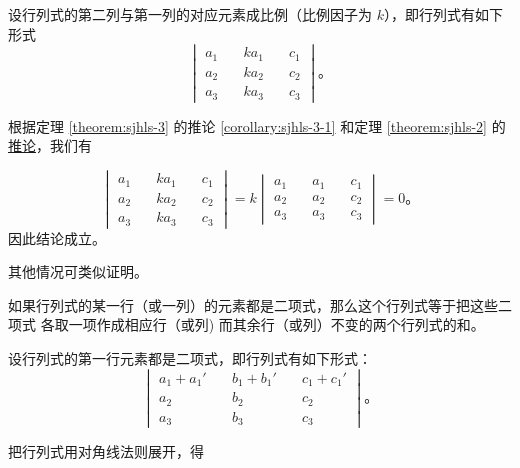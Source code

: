 \zhengming 设行列式的第二列与第一列的对应元素成比例（比例因子为 $k$），即行列式有如下形式
$$
\begin{vmatrix*}
    a_1 \quad & ka_1 \quad & c_1 \\
    a_2 \quad & ka_2 \quad & c_2 \\
    a_3 \quad & ka_3 \quad & c_3
\end{vmatrix*} \text{。}
$$

根据定理 \ref{theorem:sjhls-3} 的推论 \ref{corollary:sjhls-3-1}
和定理 \ref{theorem:sjhls-2} 的 \hyperref[corollary:sjhls-2-1]{推论}，我们有

$$
\begin{vmatrix*}
    a_1 \quad & ka_1 \quad & c_1 \\
    a_2 \quad & ka_2 \quad & c_2 \\
    a_3 \quad & ka_3 \quad & c_3
\end{vmatrix*}
= k
\begin{vmatrix*}
    a_1 \quad & a_1 \quad & c_1 \\
    a_2 \quad & a_2 \quad & c_2 \\
    a_3 \quad & a_3 \quad & c_3
\end{vmatrix*}
= 0 \text{。}
$$
因此结论成立。

其他情况可类似证明。


\begin{theorem} \label{theorem:sjhls-5}
    如果行列式的某一行（或一列）的元素都是二项式，那么这个行列式等于把这些二项式
    各取一项作成相应行（或列) 而其余行（或列）不变的两个行列式的和。
\end{theorem}

\zhengming 设行列式的第一行元素都是二项式，即行列式有如下形式：
$$
\begin{vmatrix*}
    a_1 + a_1' \quad & b_1 + b_1' \quad & c_1 + c_1' \\
    a_2 \quad & b_2 \quad & c_2 \\
    a_3 \quad & b_3 \quad & c_3
\end{vmatrix*} \text{。}
$$

把行列式用对角线法则展开，得

